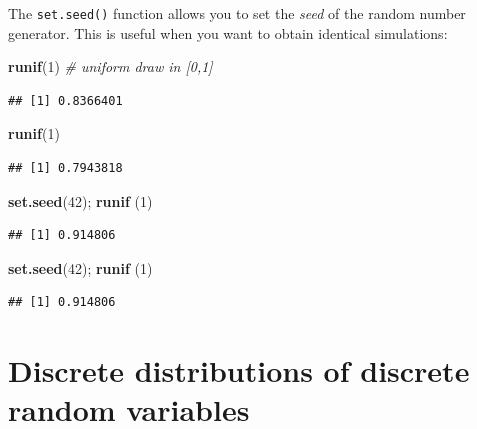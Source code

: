 \documentclass[]{book}
\newenvironment{Shaded}{\begin{snugshade}}{\end{snugshade}}
\newcommand{\CommentTok}[1]{\textcolor[rgb]{0.56,0.35,0.01}{\textit{#1}}}
\newcommand{\DecValTok}[1]{\textcolor[rgb]{0.00,0.00,0.81}{#1}}
\newcommand{\KeywordTok}[1]{\textcolor[rgb]{0.13,0.29,0.53}{\textbf{#1}}}
\newcommand{\NormalTok}[1]{#1}
\begin{document}
The \texttt{set.seed()} function allows you to set the \emph{seed} of the random number generator. This is useful when you want to obtain identical simulations:

\begin{Shaded}
\begin{Highlighting}[]
\KeywordTok{runif}\NormalTok{(}\DecValTok{1}\NormalTok{) }\CommentTok{# uniform draw in [0,1]}
\end{Highlighting}
\end{Shaded}

\begin{verbatim}
## [1] 0.8366401
\end{verbatim}

\begin{Shaded}
\begin{Highlighting}[]
\KeywordTok{runif}\NormalTok{(}\DecValTok{1}\NormalTok{)}
\end{Highlighting}
\end{Shaded}

\begin{verbatim}
## [1] 0.7943818
\end{verbatim}

\begin{Shaded}
\begin{Highlighting}[]
\KeywordTok{set.seed}\NormalTok{(}\DecValTok{42}\NormalTok{); }\KeywordTok{runif}\NormalTok{ (}\DecValTok{1}\NormalTok{)}
\end{Highlighting}
\end{Shaded}

\begin{verbatim}
## [1] 0.914806
\end{verbatim}

\begin{Shaded}
\begin{Highlighting}[]
\KeywordTok{set.seed}\NormalTok{(}\DecValTok{42}\NormalTok{); }\KeywordTok{runif}\NormalTok{ (}\DecValTok{1}\NormalTok{)}
\end{Highlighting}
\end{Shaded}

\begin{verbatim}
## [1] 0.914806
\end{verbatim}

\hypertarget{discrete-distributions-of-discrete-random-variables}{%
\section{Discrete distributions of discrete random variables}\label{discrete-distributions-of-discrete-random-variables}}
\end{document}
